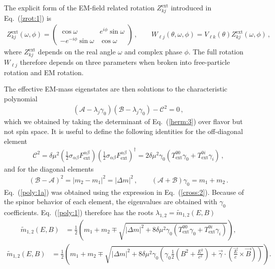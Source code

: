 \documentclass{ws-ijmpa}
\newcommand{\req}[1]{Eq.~(\ref{#1})}
\begin{document}
The explicit form of the EM-field related rotation $Z_{kj}^\mathrm{ext}$ introduced in \req{zrot:1} is
\begin{align}
\label{zrot:2}
Z_{kj}^\mathrm{ext}(\omega,\phi)=
\begin{pmatrix}
\cos\omega & e^{i\phi}\sin\omega\\
-e^{-i\phi}\sin\omega & \cos\omega
\end{pmatrix}\,,\qquad
W_{\ell j}(\theta,\omega,\phi)=V_{\ell k}(\theta)Z_{kj}^\mathrm{ext}(\omega,\phi)\,,
\end{align}
where $Z_{kj}^\mathrm{ext}$ depends on the real angle $\omega$ and complex phase $\phi$. The full rotation $W_{\ell j}$ therefore depends on three parameters when broken into free-particle rotation and EM rotation.

The effective EM-mass eigenstates are then solutions to the characteristic polynomial
\begin{align}
\label{poly:1}
(\mathcal{A}-\lambda_{j}\gamma_{0})(\mathcal{B}-\lambda_{j}\gamma_{0})-\mathcal{C}^{2}=0\,,
\end{align}
which we obtained by taking the determinant of \req{herm:3} over flavor but not spin space. It is useful to define the following identities for the off-diagonal element
\begin{align}
\label{poly:1a}
\mathcal{C}^{2} = 
\delta\mu^{2}\left(\frac{1}{2}\sigma_{\alpha\beta}F^{\alpha\beta}_\mathrm{ext}\right)\left(\frac{1}{2}\sigma_{\alpha\beta}F^{\alpha\beta}_\mathrm{ext}\right)^{\dag}=
2\delta\mu^{2}\gamma_{0}\left(T_\mathrm{ext}^{00}\gamma_{0}+T_\mathrm{ext}^{0i}\gamma_{i}\right)\,,
\end{align}
and for the diagonal elements
\begin{align}
(\mathcal{B}-\mathcal{A})^{2} = |m_{2}-m_{1}|^{2} = |\Delta m|^{2}\,,\qquad (\mathcal{A}+\mathcal{B})\gamma_{0} = m_{1} + m_{2}\,.
\end{align}
\req{poly:1a} was obtained using the expression in \req{cross:2}. Because of the spinor behavior of each element, the eigenvalues are obtained with $\gamma_{0}$ coefficients. \req{poly:1} therefore has the roots $\lambda_{1,2} = \widetilde m_{1,2}(E,B)$
\begin{align}
\label{poly:2}
\widetilde m_{1,2}(E,B)\! &=\! \frac{1}{2}\left(m_{1}\!+\!m_{2}\!\mp\!\sqrt{|\Delta m|^{2}\!+\!8\delta\mu^{2}\gamma_{0}\left(T_\mathrm{ext}^{00}\gamma_{0}+T_\mathrm{ext}^{0i}\gamma_{i}\right)}\right)\!,
\end{align}
%
\begin{align}
\label{poly:3}
\widetilde m_{1,2}(E,B)\! &=\! \frac{1}{2}\left(m_{1}\!+\!m_{2}\!\mp\!\sqrt{|\Delta m|^{2}\!+\!8\delta\mu^{2}\gamma_{0}\left(\gamma_{0}\frac{1}{2}\left(B^{2}\!+\!\frac{E^{2}}{c^{2}}\right)\!+\!\vec{\gamma}\!\cdot\!(\frac{\vec{E}}{c}\times\vec{B})\right)}\right)\!.
\end{align}
\end{document}

